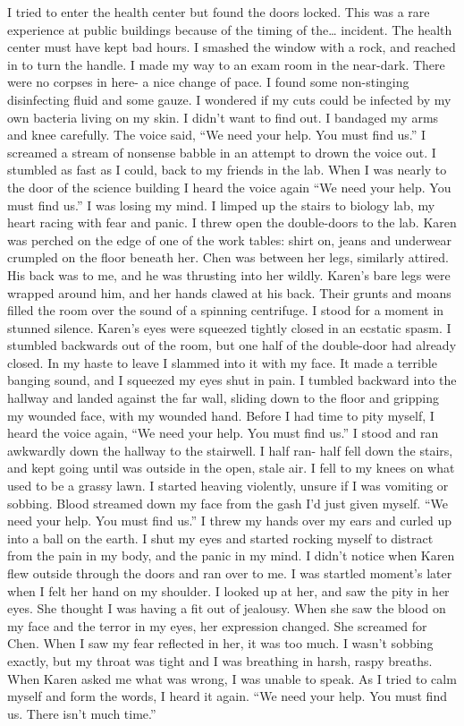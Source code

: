 \documentclass[a4paper]{article}
\begin{document}
I tried to enter the health center but found the doors locked. This was a rare experience at public buildings because of the timing of the… incident. The health center must have kept bad hours.
I smashed the window with a rock, and reached in to turn the handle. I made my way to an exam room in the near-dark. There were no corpses in here- a nice change of pace.
I found some non-stinging disinfecting fluid and some gauze. I wondered if my cuts could be infected by my own bacteria living on my skin. I didn’t want to find out.
I bandaged my arms and knee carefully. The voice said, “We need your help. You must find us.”
I screamed a stream of nonsense babble in an attempt to drown the voice out. I stumbled as fast as I could, back to my friends in the lab. When I was nearly to the door of the science building I heard the voice again “We need your help. You must find us.”
I was losing my mind. I limped up the stairs to biology lab, my heart racing with fear and panic. I threw open the double-doors to the lab.
Karen was perched on the edge of one of the work tables: shirt on, jeans and underwear crumpled on the floor beneath her. Chen was between her legs, similarly attired. His back was to me, and he was thrusting into her wildly.
Karen’s bare legs were wrapped around him, and her hands clawed at his back. Their grunts and moans filled the room over the sound of a spinning centrifuge. I stood for a moment in stunned silence.
Karen’s eyes were squeezed tightly closed in an ecstatic spasm. I stumbled backwards out of the room, but one half of the double-door had already closed. In my haste to leave I slammed into it with my face. It made a terrible banging sound, and I squeezed my eyes shut in pain. I tumbled backward into the hallway and landed against the far wall, sliding down to the floor and gripping my wounded face, with my wounded hand.
Before I had time to pity myself, I heard the voice again, “We need your help. You must find us.”
I stood and ran awkwardly down the hallway to the stairwell. I half ran- half fell down the stairs, and kept going until was outside in the open, stale air. I fell to my knees on what used to be a grassy lawn. I started heaving violently, unsure if I was vomiting or sobbing. Blood streamed down my face from the gash I’d just given myself.
“We need your help. You must find us.”
I threw my hands over my ears and curled up into a ball on the earth. I shut my eyes and started rocking myself to distract from the pain in my body, and the panic in my mind.
I didn’t notice when Karen flew outside through the doors and ran over to me. I was startled moment’s later when I felt her hand on my shoulder. I looked up at her, and saw the pity in her eyes. She thought I was having a fit out of jealousy.
When she saw the blood on my face and the terror in my eyes, her expression changed. She screamed for Chen. When I saw my fear reflected in her, it was too much. I wasn’t sobbing exactly, but my throat was tight and I was breathing in harsh, raspy breaths.
When Karen asked me what was wrong, I was unable to speak. As I tried to calm myself and form the words, I heard it again.
“We need your help. You must find us. There isn’t much time.”
\end{document}
